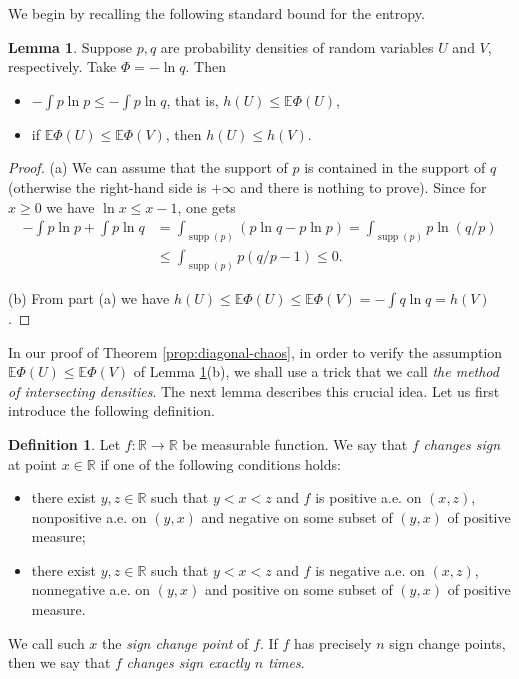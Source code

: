 \documentclass[11pt]{amsart}
\newcommand{\1}{\mathbf{1}}
\DeclareMathOperator{\supp}{supp}
\newcommand{\R}{\mathbb{R}}
\newcommand{\E}{\mathbb{E}}
\theoremstyle{definition}
\newtheorem{lemma}{Lemma}
\theoremstyle{definition}
\newtheorem{definition}{Definition}
\theoremstyle{remark}
\begin{document}
We begin by recalling the following standard bound for the entropy.

\begin{lemma}\label{lem:entropy-standard-bound}
Suppose $p,q$ are probability densities of random variables $U$ and $V$, respectively. Take $\Phi=-\ln q$. Then 
\begin{itemize}
	\item[(a)] $-\int p \ln p \leq - \int p \ln q$, that is, $h(U) \leq \E\Phi(U)$,
	\item[(b)] if $\E \Phi(U) \leq \E \Phi(V)$, then $h(U) \leq h(V)$.  
\end{itemize}
  
\end{lemma}

\begin{proof}
(a) We can assume that the support of $p$ is contained in the support of $q$ (otherwise the right-hand side is $+\infty$ and there is nothing to prove). Since for $x \geq 0$ we have $\ln x \leq x-1$, one gets
\begin{align*}
	-\int p \ln p  + \int p \ln q & = \int_{\supp(p)} (p \ln q- p \ln p) = \int_{\supp(p)} p \ln(q/p) \\ & \leq \int_{\supp(p)} p(q/p-1) \leq 0. 
\end{align*}

(b) From part (a) we have $h(U) \leq \E \Phi(U) \leq \E \Phi(V) = -\int q \ln q = h(V)$.  
\end{proof}


In our proof of Theorem \ref{prop:diagonal-chaos}, in order to verify the assumption $\E \Phi(U) \leq \E \Phi(V)$ of Lemma \ref{lem:entropy-standard-bound}(b), we shall use a trick that we call  \emph{the method of intersecting densities}. The next lemma describes this crucial idea. Let us first introduce the following definition. 

\begin{definition}
Let $f : \R \to \R$ be measurable function. We say that $f$ \emph{changes sign} at point $x \in \R$ if one of the following conditions holds:
\begin{itemize}
	\item[(a)] there exist $y, z \in \R$ such that $y < x < z$ and $f$ is positive a.e. on $(x, z)$, nonpositive a.e. on $(y, x)$ and negative on some subset of $(y, x)$ of positive measure;
	\item[(b)] there exist $y, z \in \R$ such that $y < x < z$ and $f$ is negative a.e. on $(x, z)$, nonnegative a.e. on $(y, x)$ and positive on some subset of $(y, x)$ of positive measure.  
\end{itemize}
We call such $x$ the \emph{sign change point} of $f$. If $f$ has precisely $n$ sign change points, then we say that $f$ \emph{changes sign exactly $n$ times}.  
\end{definition}
\end{document}
